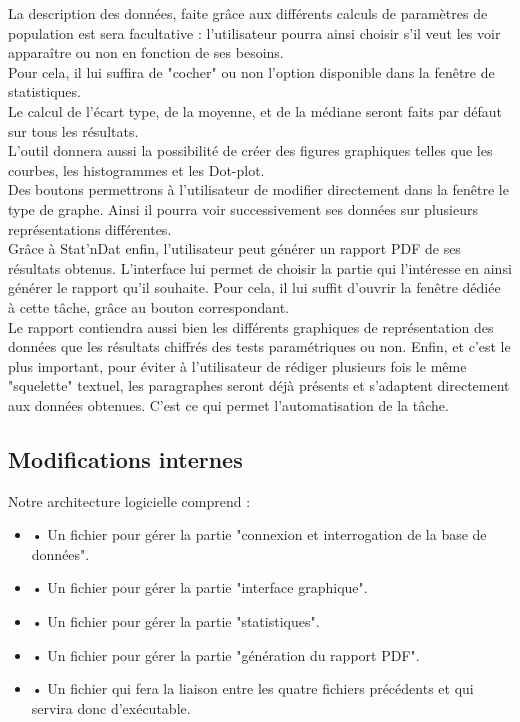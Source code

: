 \documentclass[a4paper,10pt]{report}
\begin{document}
La description des données, faite grâce aux différents calculs de paramètres de population est sera facultative : l'utilisateur pourra ainsi choisir s'il veut les voir apparaître ou non en fonction de ses besoins. \\
Pour cela, il lui suffira de "cocher" ou non l'option disponible dans la fenêtre de statistiques.\\

Le calcul de l'écart type, de la moyenne, et de la médiane seront faits par défaut sur tous les résultats.\\ 

L'outil donnera aussi la possibilité de créer des figures graphiques telles que les courbes, les histogrammes et les Dot-plot.\\
Des boutons permettrons à l'utilisateur de modifier directement dans la fenêtre le type de graphe. Ainsi il pourra voir successivement ses données sur plusieurs représentations différentes.\\

Grâce à Stat'nDat enfin, l'utilisateur peut générer un rapport PDF de ses résultats obtenus. L'interface lui permet de choisir la partie qui l'intéresse en ainsi générer le rapport qu'il souhaite. Pour cela, il lui suffit d'ouvrir la fenêtre dédiée à cette tâche, grâce au bouton correspondant.\\
Le rapport contiendra aussi bien les différents graphiques de représentation des données que les résultats chiffrés des tests paramétriques ou non. Enfin, et c'est le plus important, pour éviter à l'utilisateur de rédiger plusieurs fois le même "squelette" textuel, les paragraphes seront déjà présents et s'adaptent directement aux données obtenues. C'est ce qui permet l'automatisation de la tâche.


\subsection{Modifications internes}

Notre architecture logicielle comprend :

\begin{itemize}

\item • Un fichier pour gérer la partie "connexion et interrogation de la base de données".

\item • Un fichier pour gérer la partie "interface graphique".

\item • Un fichier pour gérer la partie "statistiques".

\item • Un fichier pour gérer la partie "génération du rapport PDF".

\item • Un fichier qui fera la liaison entre les quatre fichiers précédents et qui servira donc d'exécutable.

\end{itemize}
\end{document}
